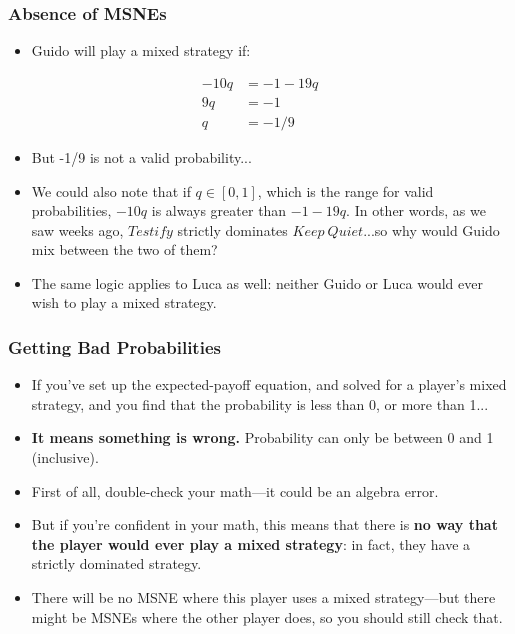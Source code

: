 \begin{frame}
\frametitle{Absence of MSNEs}
\begin{itemize}
\item Guido will play a mixed strategy if:
\end{itemize}
\begin{align*}
-10q &= -1 - 19q\\
9q &= -1\\
q &= -1/9
\end{align*}
\begin{itemize}
\item But -1/9 is not a valid probability...
\item We could also note that if $q\in [0, 1]$, which is the range for valid probabilities, $-10q$ is always greater than $-1 - 19q$. In other words, as we saw weeks ago, $Testify$ strictly dominates $Keep~Quiet$...so why would Guido mix between the two of them?
\item The same logic applies to Luca as well: neither Guido or Luca would ever wish to play a mixed strategy.
\end{itemize}
\end{frame}

\begin{frame}
\frametitle{Getting Bad Probabilities}
\begin{itemize}
	\item If you've set up the expected-payoff equation, and solved for a player's mixed strategy, and you find that the probability is less than 0, or more than 1...
	\item \textbf{It means something is wrong.} Probability can only be between 0 and 1 (inclusive).
	\item First of all, double-check your math---it could be an algebra error.
	\item But if you're confident in your math, this means that there is \textbf{no way that the player would ever play a mixed strategy}: in fact, they have a strictly dominated strategy.
	\item There will be no MSNE where this player uses a mixed strategy---but there might be MSNEs where the other player does, so you should still check that.
\end{itemize}
\end{frame}

